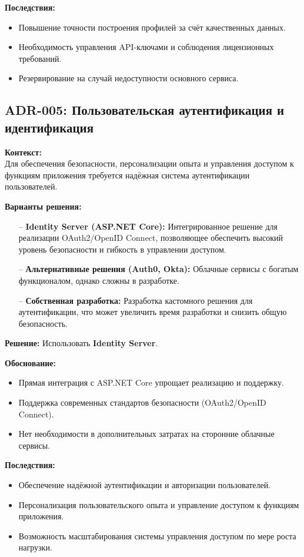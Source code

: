 \documentclass[a4paper,12pt]{article}
\begin{document}
\textbf{Последствия:}
\begin{itemize}
    \item Повышение точности построения профилей за счёт качественных данных.
    \item Необходимость управления API-ключами и соблюдения лицензионных требований.
    \item Резервирование на случай недоступности основного сервиса.
\end{itemize}

\subsection{ADR-005: Пользовательская аутентификация и идентификация}

\textbf{Контекст:}\\
Для обеспечения безопасности, персонализации опыта и управления доступом к функциям приложения требуется надёжная система аутентификации пользователей.

\textbf{Варианты решения:}
\begin{itemize}[leftmargin=2cm]
    \item[--] \textbf{Identity Server (ASP.NET Core):} Интегрированное решение для реализации OAuth2/OpenID Connect, позволяющее обеспечить высокий уровень безопасности и гибкость в управлении доступом.
    \item[--] \textbf{Альтернативные решения (Auth0, Okta):} Облачные сервисы с богатым функционалом, однако сложны в разработке.
    \item[--] \textbf{Собственная разработка:} Разработка кастомного решения для аутентификации, что может увеличить время разработки и снизить общую безопасность.
\end{itemize}

\textbf{Решение:} Использовать \textbf{Identity Server}.

\textbf{Обоснование:}
\begin{itemize}
    \item Прямая интеграция с ASP.NET Core упрощает реализацию и поддержку.
    \item Поддержка современных стандартов безопасности (OAuth2/OpenID Connect).
    \item Нет необходимости в дополнительных затратах на сторонние облачные сервисы.
\end{itemize}

\textbf{Последствия:}
\begin{itemize}
    \item Обеспечение надёжной аутентификации и авторизации пользователей.
    \item Персонализация пользовательского опыта и управление доступом к функциям приложения.
    \item Возможность масштабирования системы управления доступом по мере роста нагрузки.
\end{itemize}
\end{document}

